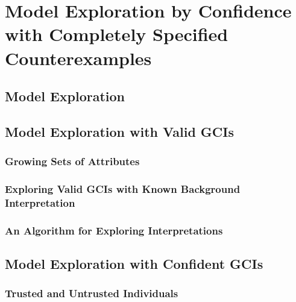 
\chapter[Model Exploration by Confidence]{Model Exploration by Confidence with Completely Specified Counterexamples}
\label{cha:model-expl-conf}


\section{Model Exploration}
\label{sec:model-exploration}

%

\section{Model Exploration with Valid GCIs}
\label{sec:model-expl-with}


\subsection{Growing Sets of Attributes}
\label{sec:grow-sets-attr}

\subsection{Exploring Valid GCIs with Known Background Interpretation}
\label{sec:comp-bases-given}

\subsection{An Algorithm for Exploring Interpretations}
\label{sec:an-algor-expl}

\section{Model Exploration with Confident GCIs}
\label{sec:model-expl-with-1}

%

\subsection{Trusted and Untrusted Individuals}
\label{sec:trust-untr-indiv}

